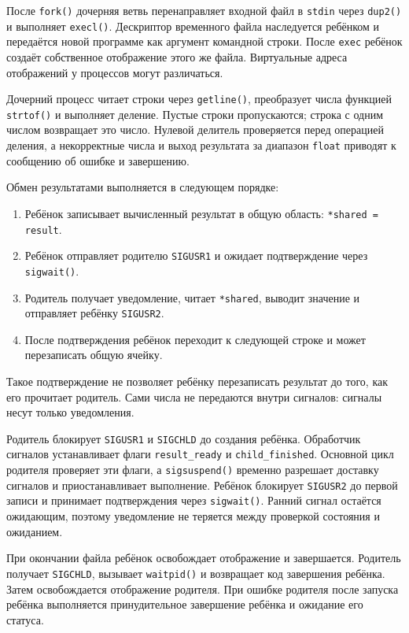 \documentclass[12pt, a4paper]{article}
\begin{document}
После \texttt{fork()} дочерняя ветвь перенаправляет входной файл в \texttt{stdin} через \texttt{dup2()} и выполняет \texttt{execl()}. Дескриптор временного файла наследуется ребёнком и передаётся новой программе как аргумент командной строки. После \texttt{exec} ребёнок создаёт собственное отображение этого же файла. Виртуальные адреса отображений у процессов могут различаться.

Дочерний процесс читает строки через \texttt{getline()}, преобразует числа функцией \texttt{strtof()} и выполняет деление. Пустые строки пропускаются; строка с одним числом возвращает это число. Нулевой делитель проверяется перед операцией деления, а некорректные числа и выход результата за диапазон \texttt{float} приводят к сообщению об ошибке и завершению.

Обмен результатами выполняется в следующем порядке:
\begin{enumerate}
\raggedright
  \item Ребёнок записывает вычисленный результат в общую область: \texttt{*shared = result}.
  \item Ребёнок отправляет родителю \texttt{SIGUSR1} и ожидает подтверждение через \texttt{sigwait()}.
  \item Родитель получает уведомление, читает \texttt{*shared}, выводит значение и отправляет ребёнку \texttt{SIGUSR2}.
  \item После подтверждения ребёнок переходит к следующей строке и может перезаписать общую ячейку.
\end{enumerate}

Такое подтверждение не позволяет ребёнку перезаписать результат до того, как его прочитает родитель. Сами числа не передаются внутри сигналов: сигналы несут только уведомления.

Родитель блокирует \texttt{SIGUSR1} и \texttt{SIGCHLD} до создания ребёнка. Обработчик сигналов устанавливает флаги \texttt{result\_ready} и \texttt{child\_finished}. Основной цикл родителя проверяет эти флаги, а \texttt{sigsuspend()} временно разрешает доставку сигналов и приостанавливает выполнение. Ребёнок блокирует \texttt{SIGUSR2} до первой записи и принимает подтверждения через \texttt{sigwait()}. Ранний сигнал остаётся ожидающим, поэтому уведомление не теряется между проверкой состояния и ожиданием.

При окончании файла ребёнок освобождает отображение и завершается. Родитель получает \texttt{SIGCHLD}, вызывает \texttt{waitpid()} и возвращает код завершения ребёнка. Затем освобождается отображение родителя. При ошибке родителя после запуска ребёнка выполняется принудительное завершение ребёнка и ожидание его статуса.
\end{document}
